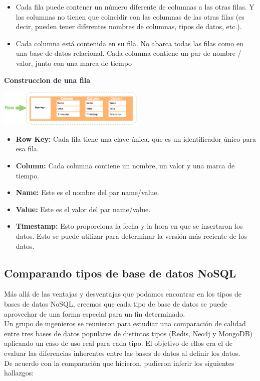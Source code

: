 \documentclass[twoside,twocolumn]{article}
\begin{document}
\begin{itemize}	

	\item Cada fila  puede contener un número diferente de columnas a las otras filas. Y las columnas no tienen que coincidir con las columnas de las otras filas (es decir, pueden tener diferentes nombres de columnas, tipos de datos, etc.).
	\item Cada columna  está contenida en su fila. No abarca todas las filas como en una base de datos relacional. Cada columna contiene un par de nombre / valor, junto con una marca de tiempo

\end{itemize} 

\textbf{Construccion de una fila}
\begin{center}
	\includegraphics[width=7cm]{./Imagenes/row} 
\end{center}
\begin{itemize}	

	\item \textbf{Row Key:} Cada fila tiene una clave única, que es un identificador único para esa fila.
	\item \textbf{Column:} Cada columna contiene un nombre, un valor y una marca de tiempo.
	\item \textbf {Name:} Este es el nombre del par name/value.
	\item \textbf{Value:} Este es el valor del par name/value.
	\item \textbf{Timestamp:} Esto proporciona la fecha y la hora en que se insertaron los datos. Esto se puede utilizar para determinar la versión más reciente de los datos.
\end{itemize} 

\subsection{Comparando tipos de base de datos  NoSQL}
Más allá de las ventajas y desventajas que podamos encontrar en los tipos de bases de datos NoSQL, creemos que cada tipo de base de datos se puede aprovechar de una forma especial para un fin determinado. \\
Un grupo de ingenieros se reunieron para estudiar una comparación de calidad entre tres bases de datos populares de distintos tipos (Redis, Neo4j y MongoDB) aplicando un caso de uso real para cada tipo. El objetivo de ellos era el de evaluar las diferencias inherentes entre las bases de datos al definir los datos. \\
De acuerdo con la comparación que hicieron, pudieron inferir los siguientes hallazgos:
\end{document}
